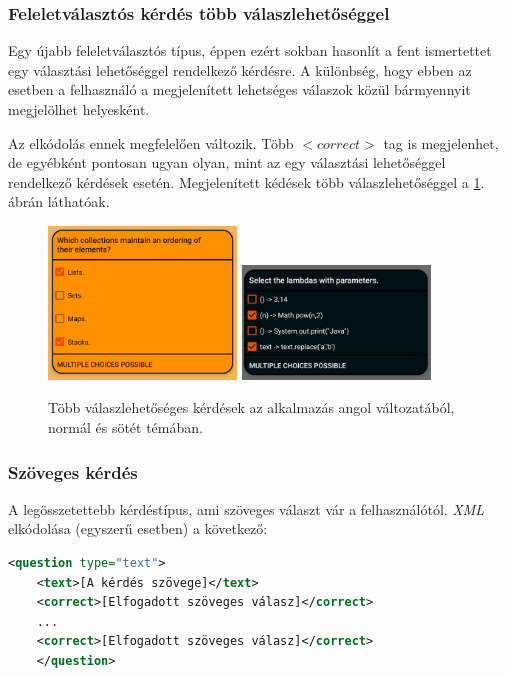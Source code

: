 \documentclass[12pt,a4paper]{article}
\newcommand{\xml}{\textit{XML}\xspace}
\begin{document}
	\subsubsection{Feleletválasztós kérdés több válaszlehetőséggel}
	
	Egy újabb feleletválasztós típus, éppen ezért sokban hasonlít a fent ismertettet egy választási lehetőséggel rendelkező kérdésre. A különbség, hogy ebben az esetben a felhasználó a megjelenített lehetséges válaszok közül bármyennyit megjelölhet helyesként.
	
	Az elkódolás ennek megfelelően változik. Több $<correct>$ tag is megjelenhet, de egyébként pontosan ugyan olyan, mint az egy választási lehetőséggel rendelkező kérdések esetén. Megjelenített kédések több válaszlehetőséggel a \ref{question_multi_choice_figure}. ábrán láthatóak.
	
	\begin{figure}[h!]
		\centering
		\includegraphics[width=5cm]{question_multi_choice}
		\includegraphics[width=5cm]{question_multi_choice_dark}
		\caption{Több válaszlehetőséges kérdések az alkalmazás angol változatából, normál és sötét témában.}
		\label{question_multi_choice_figure}
	\end{figure}
	
	\subsubsection{Szöveges kérdés}\label{question_text}
	
	A legösszetettebb kérdéstípus, ami szöveges választ vár a felhasználótól. \xml elkódolása (egyszerű esetben) a következő:
	
	\bigskip
	\begin{lstlisting}[language=XML]
	<question type="text">
	<text>[A kérdés szövege]</text>
	<correct>[Elfogadott szöveges válasz]</correct>
	...
	<correct>[Elfogadott szöveges válasz]</correct>
	</question>
	\end{lstlisting}
	\bigskip
	
\end{document}
